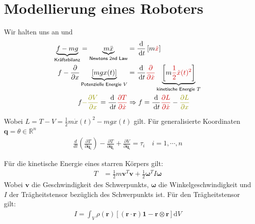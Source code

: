 \documentclass[a4paper, 12pt]{scrartcl}
\newcommand{\rot}[2][rot]{\textcolor{#1}{#2}}
\newcommand{\dunkelgelb}[2][dunkelgelb]{\textcolor{#1}{#2}}
\newcommand{\dt}{\thinspace \mathrm{d}t}
\begin{document}
\section{Modellierung eines Roboters}

Wir halten uns an \cite{spong2004} und \cite{siciliano2010}
\begin{align*}
    \underbrace{f - mg}_{\textsf{Kräftebilanz}} 
    = \underbrace{m \ddot{x}}_{\textsf{Newtons 2nd Law}} 
    &= \frac{\mathrm{d}}{\dt} \left[m \rot{\dot{x}} \right] \\
    f - \frac{\mathrm{\partial}}{\partial x} 
    \underbrace{
        \left[ mg x(t) \right]
        }_{\textsf{Potenzielle Energie }V} 
    &= \frac{\mathrm{d}}{\dt} \rot{\frac{\partial}{\partial \dot{x}}} 
    \underbrace{
        \left[m \rot{ \frac{1}{2} \dot{x}(t)^2} \right]
        }_{\textsf{kinetische Energie } T} \\
    f \dunkelgelb{- \frac{\partial V}{\partial x}} 
    = \frac{\mathrm{d}}{\dt} \rot{\frac{\partial T}{\partial \dot{x}}}
    &\Rightarrow
    f = \frac{\mathrm{d}}{\dt} \rot{\frac{\partial L}{\partial \dot{x}}} 
    - \dunkelgelb{\frac{\partial L}{\partial x}} 
\end{align*}

Wobei $L = T - V = \frac{1}{2}m \dot{x}(t)^2 -mg x(t)$ gilt.
Für generalisierte Koordinaten $\textbf{q} = \theta \in \mathbb{R}^n$
%
\begin{align*}
\frac{d}{dt} \left( \frac{\partial T}{\partial \dot{\textbf{q}}_{i}}  \right) 
- \frac{\partial T}{\partial \textbf{q}_i}  
+ \frac{\partial V}{\partial \textbf{q}_i} 
= \tau_i \quad i=1, \cdots , n
\end{align*}

Für die kinetische Energie eines starren Körpers gilt:
%
\begin{align*}
    T 
    &= \frac{1}{2} m \textbf{v}^T \textbf{v} 
    + \frac{1}{2} \boldsymbol{\omega}^T I \boldsymbol{\omega}
\end{align*}
%
Wobei $\textbf{v}$ die Geschwindigkeit des Schwerpunkts, 
$\boldsymbol{\omega}$ die Winkelgeschwindigkeit 
und $I$ der Trägheitstensor bezüglich des Schwerpunkts ist.
Für den Trägheitstensor gilt:
\begin{align}
    I = \int_V \rho(\textbf{r}) 
    [(\textbf{r} \cdot \textbf{r}) \textbf{1} 
    - \textbf{r} \otimes \textbf{r}] \mathrm{d}V \label{eq:traegheitstensor}
\end{align}
\end{document}

